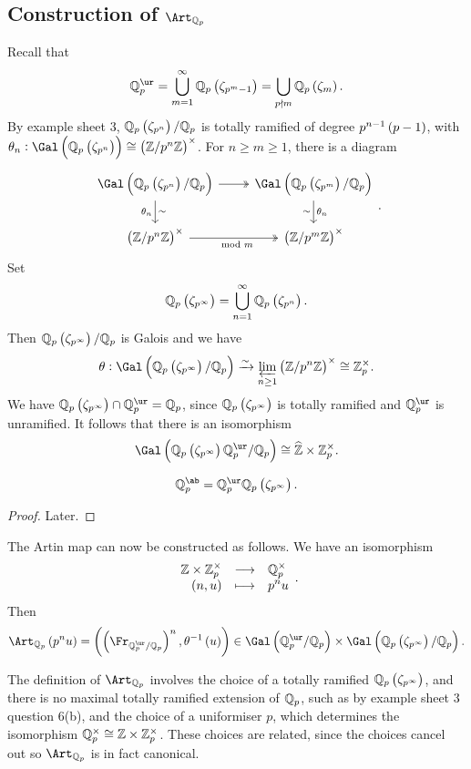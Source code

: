 \subsection{Construction of \texorpdfstring{$ \Art_{\QQ_p} $}{Art Qp}}

Recall that
$$ \QQ_p^{\ur} = \bigcup_{m = 1}^\infty \QQ_p\br{\zeta_{p^m - 1}} = \bigcup_{p \nmid m} \QQ_p\br{\zeta_m}. $$
By example sheet $ 3 $, $ \QQ_p\br{\zeta_{p^n}} / \QQ_p $ is totally ramified of degree $ p^{n - 1}\br{p - 1} $, with $ \theta_n : \Gal\br{\QQ_p\br{\zeta_{p^n}}} \cong \br{\ZZ / p^n\ZZ}^\times $. For $ n \ge m \ge 1 $, there is a diagram
$$
\begin{tikzcd}
\Gal\br{\QQ_p\br{\zeta_{p^n}} / \QQ_p} \arrow[twoheadrightarrow]{r} \arrow{d}{\sim}[swap]{\theta_n} & \Gal\br{\QQ_p\br{\zeta_{p^m}} / \QQ_p} \arrow{d}{\theta_n}[swap]{\sim} \\
\br{\ZZ / p^n\ZZ}^\times \arrow[twoheadrightarrow]{r}[swap]{\mod m} & \br{\ZZ / p^m\ZZ}^\times
\end{tikzcd}.
$$
Set
$$ \QQ_p\br{\zeta_{p^\infty}} = \bigcup_{n = 1}^\infty \QQ_p\br{\zeta_{p^n}}. $$
Then $ \QQ_p\br{\zeta_{p^\infty}} / \QQ_p $ is Galois and we have
$$ \theta : \Gal\br{\QQ_p\br{\zeta_{p^\infty}} / \QQ_p} \xrightarrow{\sim} \varprojlim_{n \ge 1} \br{\ZZ / p^n\ZZ}^\times \cong \ZZ_p^\times. $$
We have $ \QQ_p\br{\zeta_{p^\infty}} \cap \QQ_p^{\ur} = \QQ_p $, since $ \QQ_p\br{\zeta_{p^\infty}} $ is totally ramified and $ \QQ_p^{\ur} $ is unramified. It follows that there is an isomorphism
$$ \Gal\br{\QQ_p\br{\zeta_{p^\infty}}\QQ_p^{\ur} / \QQ_p} \cong \widehat{\ZZ} \times \ZZ_p^\times. $$

\begin{theorem}
$$ \QQ_p^{\ab} = \QQ_p^{\ur}\QQ_p\br{\zeta_{p^\infty}}. $$
\end{theorem}

\begin{proof}
Later.
\end{proof}

The Artin map can now be constructed as follows. We have an isomorphism
$$ \function{\ZZ \times \ZZ_p^\times}{\QQ_p^\times}{\br{n, u}}{p^nu}. $$
Then
$$ \Art_{\QQ_p}\br{p^nu} = \br{\br{\Fr_{\QQ_p^{\ur} / \QQ_p}}^n, \theta^{-1}\br{u}} \in \Gal\br{\QQ_p^{\ur} / \QQ_p} \times \Gal\br{\QQ_p\br{\zeta_{p^\infty}} / \QQ_p}. $$

\pagebreak

\begin{remark*}
The definition of $ \Art_{\QQ_p} $ involves the choice of a totally ramified $ \QQ_p\br{\zeta_{p^\infty}} $, and there is no maximal totally ramified extension of $ \mathbb{Q}_p $, such as by example sheet $ 3 $ question $ 6 $(b), and the choice of a uniformiser $ p $, which determines the isomorphism $ \mathbb{Q}_p^\times \cong \mathbb{Z} \times \mathbb{Z}_p^\times $. These choices are related, since the choices cancel out so $ \Art_{\QQ_p} $ is in fact canonical.
\end{remark*}

